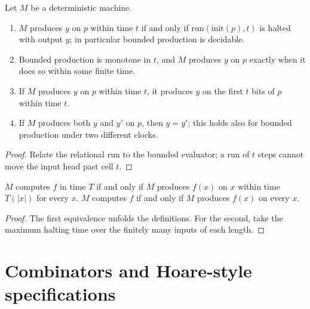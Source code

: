 \begin{lemma}
  \label{lem:models-produces-basic}
  \leanok
  Let $M$ be a deterministic machine.
  \begin{enumerate}
    \item $M$ produces $y$ on $p$ within time $t$ if and only if
      $\mathrm{run}(\mathrm{init}(p), t)$ is halted with output $y$; in
      particular bounded production is decidable.
    \item Bounded production is monotone in $t$, and $M$ produces $y$ on $p$
      exactly when it does so within some finite time.
    \item If $M$ produces $y$ on $p$ within time $t$, it produces $y$ on the
      first $t$ bits of $p$ within time $t$.
    \item If $M$ produces both $y$ and $y'$ on $p$, then $y = y'$; this holds
      also for bounded production under two different clocks.
  \end{enumerate}
\end{lemma}
\begin{proof}
  \leanok
  Relate the relational run to the bounded evaluator; a run of $t$ steps
  cannot move the input head past cell $t$.
\end{proof}

\begin{lemma}
  \label{lem:models-computes-iff-produces}
  \leanok
  $M$ computes $f$ in time $T$ if and only if $M$ produces $f(x)$ on $x$ within
  time $T(|x|)$ for every $x$. $M$ computes $f$ if and only if $M$ produces
  $f(x)$ on every $x$.
\end{lemma}
\begin{proof}
  \leanok
  The first equivalence unfolds the definitions. For the second, take the maximum
  halting time over the finitely many inputs of each length.
\end{proof}

\section{Combinators and Hoare-style specifications}

